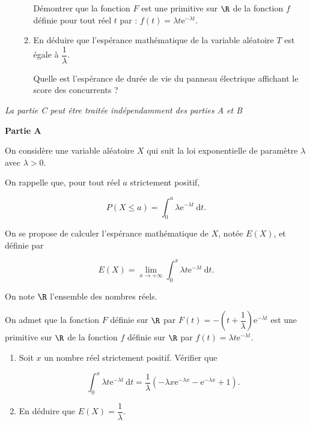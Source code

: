 \documentclass[12pt,french]{article}
\begin{document}
\begin{question}[subtitle={Asie 2015}]
\begin{enumerate}
\begin{enumerate}
        Démontrer que la fonction $F$ est une primitive sur $\R$ de la
        fonction $f$ définie pour tout réel $t$ par : $f(t) = \lambda
        t\text{e}^{- \lambda t}$.
      \item En déduire que l'espérance mathématique de la variable aléatoire
        $T$ est égale à $\dfrac{1}{\lambda}$.

        Quelle est l'espérance de durée de vie du panneau électrique
        affichant le score des
        concurrents ?
    \end{enumerate}
\end{enumerate}

\end{question}

\begin{question}[subtitle={Antilles Guyane 2015}]
\emph{La partie C peut être traitée indépendamment des parties A et B}

\bigskip

\textbf{Partie A}

\medskip

On considère une variable aléatoire $X$ qui suit la loi exponentielle de
paramètre $\lambda$ avec $\lambda > 0$.

On rappelle que, pour tout réel $a$ strictement positif,

\[P(X \leqslant  a) = \displaystyle\int_0^a \lambda\text{e}^{- \lambda
t}\:\text{d}t.\]

On se propose de calculer l'espérance mathématique de $X$, notée $E(X)$, et
définie par

\[E(X) = \displaystyle\lim_{x \to + \infty} \int_0^x \lambda t \text{e}^{-
\lambda t}\:\text{d}t.\]

On note $\R$ l'ensemble des nombres réels.

On admet que la fonction $F$ définie sur $\R$ par $F(t) = - \left(t +
\dfrac{1}{\lambda}\right)\text{e}^{- \lambda t}$ est une primitive sur $\R$
de la fonction $f$ définie sur $\R$ par $f(t) = \lambda t \text{e}^{-
\lambda t}$.

\medskip

\begin{enumerate}
  \item Soit $x$ un nombre réel strictement positif. Vérifier que

    \[\displaystyle \int_0^x \lambda t \text{e}^{- \lambda t}\:\text{d}t =
      \dfrac{1}{\lambda}\left(- \lambda x \text{e}^{- \lambda x} -
    \text{e}^{- \lambda x} + 1\right).\]

  \item  En déduire que $E(X) = \dfrac{1}{\lambda}$.
\end{enumerate}


\end{question}
\end{document}

